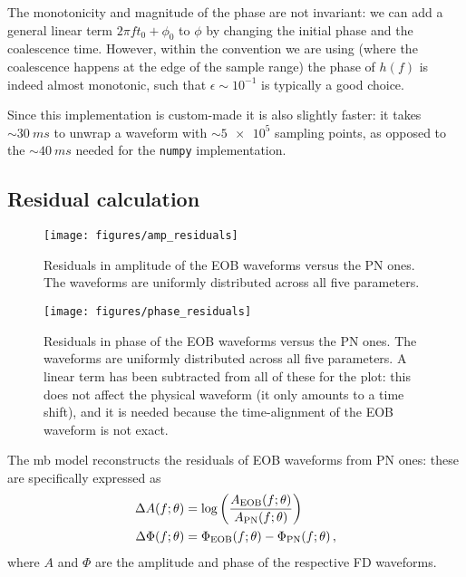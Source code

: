 \documentclass[main.tex]{subfiles}
\begin{document}
The monotonicity and magnitude of the phase are not invariant: we can add a general linear term \(2 \pi f t_0 + \phi_0 \) to \(\phi \) by changing the initial phase and the coalescence time. 
However, within the convention we are using (where the coalescence happens at the edge of the sample range) the phase of \(h(f)\) is indeed almost monotonic, such that \(\epsilon \sim 10^{-1}\) is typically a good choice.

Since this implementation is custom-made it is also slightly faster: it takes \(\sim \SI{30}{ms}\) to unwrap a waveform with \(\sim \num{5e5}\) sampling points,  as opposed to the \(\sim \SI{40}{ms}\) needed for the \texttt{numpy} implementation. 

\subsection{Residual calculation} \label{sec:residuals}

\begin{figure}[ht]
\centering
\texttt{[image: figures/amp\_residuals]}
\caption{Residuals in amplitude of the EOB waveforms versus the \ac{PN} ones. The waveforms are uniformly distributed across all five parameters. }
\label{fig:amp_residuals}
\end{figure}

\begin{figure}[ht]
\centering
\texttt{[image: figures/phase\_residuals]}
\caption{Residuals in phase of the \ac{EOB} waveforms versus the \ac{PN} ones. The waveforms are uniformly distributed across all five parameters.
A linear term has been subtracted from all of these for the plot: this does not affect the physical waveform (it only amounts to a time shift), and it is needed because the time-alignment of the \ac{EOB} waveform is not exact.}
\label{fig:phase_residuals}
\end{figure}

The \ac{mb} model reconstructs the residuals of \ac{EOB} waveforms from \ac{PN} ones: these are specifically expressed as 
%
\begin{align} \label{eq:amplitude-phase-residuals}
\Delta A(f;\theta ) &= \log \qty(\frac{A _{\text{EOB}} (f;\theta )}{A _{\text{PN}} (f;\theta )}) \\
\Delta \Phi (f; \theta ) &= \Phi _{\text{EOB}} (f; \theta ) - \Phi _{\text{PN}} (f; \theta )
\,,
\end{align}
%
where \(A\) and \(\Phi \) are the amplitude and phase of the respective \ac{FD} waveforms. 
\end{document}

